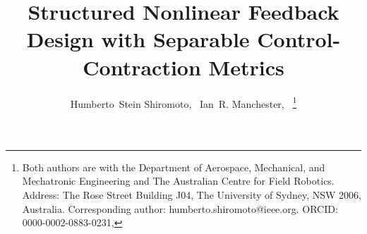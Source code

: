 \documentclass[10pt,twocolumn,twoside]{IEEEtran}
\theoremstyle{plain}
\theoremstyle{definition}
\theoremstyle{remark}
\begin{document}
%
\title{Structured Nonlinear Feedback Design with Separable Control-Contraction Metrics}
%
%
%

\author{Humberto~Stein Shiromoto,~
        Ian~R. Manchester,~%
\thanks{Both authors are with the Department of Aerospace, Mechanical, and Mechatronic Engineering and The Australian Centre for Field Robotics. Address: The
Rose Street Building J04, The University of Sydney, NSW 2006, Australia. Corresponding author: humberto.shiromoto@ieee.org. ORCID: 0000-0002-0883-0231, }%
}

% 
%



% 
\end{document}
